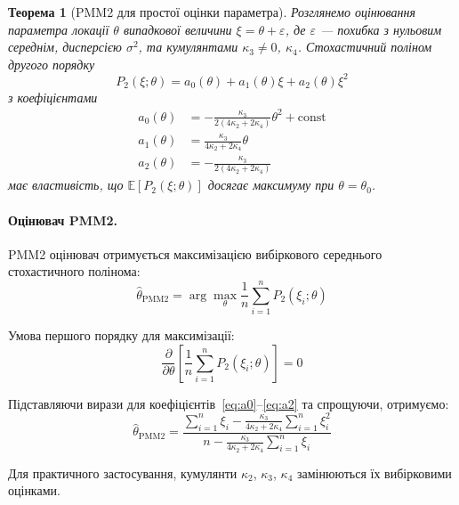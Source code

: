 \documentclass[12pt,a4paper]{article}
\newtheorem{theorem}{Теорема}[section]
\begin{document}
\begin{theorem}[PMM2 для простої оцінки параметра]
\label{thm:pmm2_basic}
Розглянемо оцінювання параметра локації $\theta$ випадкової величини $\xi = \theta + \varepsilon$, де $\varepsilon$ --- похибка з нульовим середнім, дисперсією $\sigma^2$, та кумулянтами $\kappa_3 \neq 0$, $\kappa_4$. Стохастичний поліном другого порядку
\begin{equation}
\label{eq:pmm2_polynomial}
P_2(\xi; \theta) = a_0(\theta) + a_1(\theta) \xi + a_2(\theta) \xi^2
\end{equation}
з коефіцієнтами
\begin{align}
a_0(\theta) &= -\frac{\kappa_3}{2(4\kappa_2 + 2\kappa_4)} \theta^2 + \text{const} \label{eq:a0} \\
a_1(\theta) &= \frac{\kappa_3}{4\kappa_2 + 2\kappa_4} \theta \label{eq:a1} \\
a_2(\theta) &= -\frac{\kappa_3}{2(4\kappa_2 + 2\kappa_4)} \label{eq:a2}
\end{align}
має властивість, що $\mathbb{E}[P_2(\xi; \theta)]$ досягає максимуму при $\theta = \theta_0$.
\end{theorem}

\paragraph{Оцінювач PMM2.}

PMM2 оцінювач отримується максимізацією вибіркового середнього стохастичного полінома:
\begin{equation}
\label{eq:pmm2_estimator}
\hat{\theta}_{\text{PMM2}} = \arg\max_{\theta} \frac{1}{n} \sum_{i=1}^{n} P_2(\xi_i; \theta)
\end{equation}

Умова першого порядку для максимізації:
\begin{equation}
\label{eq:pmm2_foc}
\frac{\partial}{\partial \theta} \left[ \frac{1}{n} \sum_{i=1}^{n} P_2(\xi_i; \theta) \right] = 0
\end{equation}

Підставляючи вирази для коефіцієнтів~\eqref{eq:a0}--\eqref{eq:a2} та спрощуючи, отримуємо:
\begin{equation}
\label{eq:pmm2_solution}
\hat{\theta}_{\text{PMM2}} = \frac{\sum_{i=1}^{n} \xi_i - \frac{\kappa_3}{4\kappa_2 + 2\kappa_4} \sum_{i=1}^{n} \xi_i^2}{n - \frac{\kappa_3}{4\kappa_2 + 2\kappa_4} \sum_{i=1}^{n} \xi_i}
\end{equation}

Для практичного застосування, кумулянти $\kappa_2$, $\kappa_3$, $\kappa_4$ замінюються їх вибірковими оцінками.
\end{document}
